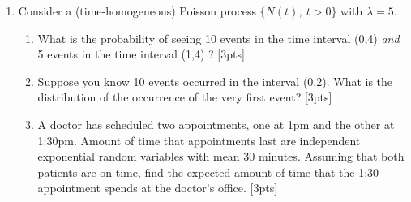 \documentclass[12pt]{article}
\begin{document}
\begin{enumerate}
\item Consider a (time-homogeneous) Poisson process $\{N(t),\:t>0\}$ with $\lambda=5$. 
\begin{enumerate}
\item What is the probability of seeing 10 events in the time interval (0,4) {\it and} 5 events in the time interval (1,4) ? [3pts]
\item Suppose you know 10 events occurred in the interval (0,2). What is the distribution of the occurrence of the very first event? [3pts]
\item A doctor has scheduled two appointments, one at 1pm and
the other at 1:30pm. Amount of time that appointments last are
independent exponential random variables with mean 30 minutes.
Assuming that both patients are on time, find the expected amount of
time that the 1:30 appointment spends at the doctor's office. [3pts]


\end{enumerate}
\end{enumerate}
\end{document}
